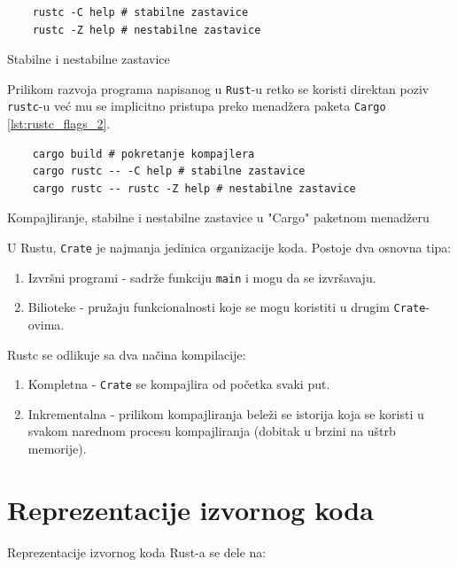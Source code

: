 \documentclass[11pt]{article}
\begin{document}
\begin{listing}[H]
\begin{verbatim}
    rustc -C help # stabilne zastavice 
    rustc -Z help # nestabilne zastavice 
\end{verbatim}
\caption{Stabilne i nestabilne zastavice}
\label{lst:rustc_flags}
\end{listing}

Prilikom razvoja programa napisanog u \verb|Rust|-u retko se koristi direktan poziv \verb|rustc|-u već mu 
se implicitno pristupa preko menadžera paketa \verb|Cargo| \ref{lst:rustc_flags_2}. 

\begin{listing}[H]
\begin{verbatim}
    cargo build # pokretanje kompajlera
    cargo rustc -- -C help # stabilne zastavice 
    cargo rustc -- rustc -Z help # nestabilne zastavice 
\end{verbatim}
\caption{Kompajliranje, stabilne i nestabilne zastavice u "Cargo" paketnom menadžeru}
\label{lst:rustc_flags_2}
\end{listing}

U Rustu, \verb|Crate| je najmanja jedinica organizacije koda. Postoje dva osnovna tipa:

\begin{enumerate}
    \item Izvršni programi - sadrže funkciju \verb|main| i mogu da se izvršavaju.
    \item Bilioteke - pružaju funkcionalnosti koje se mogu koristiti u drugim \verb|Crate|-ovima.
\end{enumerate} 

Rustc se odlikuje sa dva načina kompilacije: 
\begin{enumerate}
    \item Kompletna - \verb|Crate| se kompajlira od početka svaki put.
    \item Inkrementalna - prilikom kompajliranja beleži se istorija koja se koristi u svakom narednom procesu kompajliranja (dobitak u brzini na uštrb memorije).
\end{enumerate}

\section{Reprezentacije izvornog koda}

Reprezentacije izvornog koda Rust-a se dele na:
\end{document}
